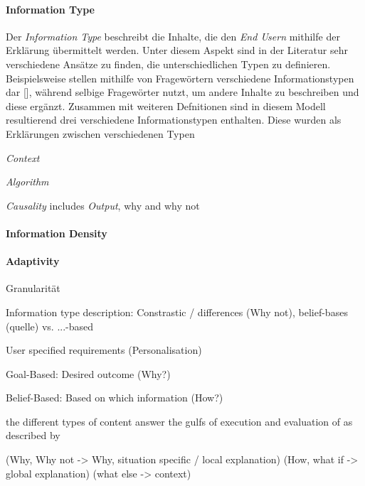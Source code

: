 \paragraph{Information Type} Der \textit{Information Type} beschreibt die Inhalte, die den \textit{End Usern} mithilfe der Erklärung übermittelt werden. Unter diesem Aspekt sind in der Literatur sehr verschiedene Ansätze zu finden, die unterschiedlichen Typen zu definieren. Beispielsweise stellen \cite{chazette_end-users_nodate} mithilfe von Fragewörtern verschiedene Informationstypen dar [\cite{chazette_end-users_nodate}], während \citeauthor{rosenfeld_explainability_2019} selbige Fragewörter nutzt, um andere Inhalte zu beschreiben und diese ergänzt. Zusammen mit weiteren Defnitionen \cite{kaptein_personalised_2017, abdulrahman_belief-based_2019} sind in diesem Modell resultierend drei verschiedene Informationstypen enthalten. Diese wurden als Erklärungen zwischen verschiedenen Typen

\textit{Context}

\textit{Algorithm}

\textit{Causality} includes \textit{Output}, why and why not

\paragraph{Information Density}

\paragraph{Adaptivity}

Granularität

Information type description: Constrastic / differences (Why not), belief-bases (quelle) vs. ...-based

User specified requirements (Personalisation) \cite{tintarev_designing_nodate, sokol_explainability_2020}

Goal-Based: Desired outcome (Why?) \cite{kaptein_personalised_2017, abdulrahman_belief-based_2019}

Belief-Based: Based on which information (How?) \cite{kaptein_personalised_2017, abdulrahman_belief-based_2019}

the different types of content answer the gulfs of execution and evaluation of \cite{norman1988psychology} as described by \cite{ribera2019can}

(Why, Why not -> Why, situation specific / local explanation) (How, what if -> global explanation) (what else -> context) \cite{lim_2009_assessing}

